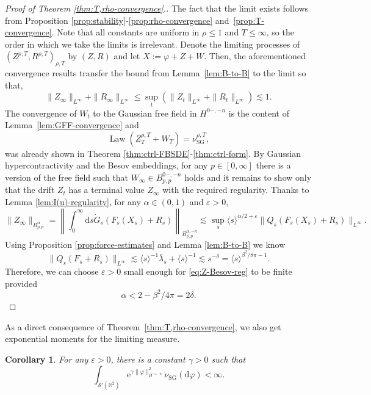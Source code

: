 \documentclass[11pt, a4paper]{scrartcl}
\numberwithin{equation}{section}
\theoremstyle{plain}
\newtheorem{corollary}[foo]{Corollary}
\theoremstyle{remark}
\newcommand{\assign}{:=}
\newcommand{\mathd}{\mathrm{d}}
\newcommand{\mathe}{\mathrm{e}}
\newcommand{\tmop}[1]{\ensuremath{\operatorname{#1}}}
\begin{document}
\begin{proof}[Proof of Theorem \ref{thm:T,rho-convergence}.]
  The fact that the limit exists follows from Proposition
  \ref{prop:stability}-\ref{prop:rho-convergence}
  and~\ref{prop:T-convergence}. Note that all constants are uniform in $\rho
  \leqslant 1$ and $T \leqslant \infty$, so the order in which we take the
  limits is irrelevant. Denote the limiting processes of $(Z^{\rho, T},
  R^{\rho, T})_{\rho, T}$ by $(Z, R)$ and let $X \assign \varphi + Z + W$.
  Then, the aforementioned convergence results transfer the bound from
  Lemma~\ref{lem:B-to-B} to the limit so that,
  \[ \| Z_{\infty} \|_{L^{\infty}} + \| R_{\infty} \|_{L^{\infty}} \leqslant
     \sup_t (\| Z_t \|_{L^{\infty}} + \| R_t \|_{L^{\infty}}) \lesssim 1. \]
  The convergence of $W_t$ to the Gaussian free field in $H^{0 -, - n}$ is the
  content of Lemma~\ref{lem:GFF-convergence} and
  \[ \tmop{Law} (Z_T^{\rho, T} + W_T) = \nu_{\tmop{SG}}^{\rho, T}, \]
  was already shown in Theorem \ref{thm:ctrl-FBSDE}-\ref{thm:ctrl-form}. By
  Gaussian hypercontractivity and the Besov embeddings,
  for any $p \in [0, \infty]$ there is a version
  of the free field such that $W_{\infty} \in B_{p, p}^{0 -, - n}$ holds and it
  remains to show only that the drift $Z_t$ has a terminal value $Z_{\infty}$
  with the required regularity. Thanks to Lemma \ref{lem:I(u)-regularity}, for
  any $\alpha \in (0, 1)$ and $\varepsilon > 0$,
  \begin{equation}
    \| Z_{\infty} \|_{B_{p, p}^{\alpha}} = \left\| \int_0^{\infty} \mathd s
    \dot{G}_s (F_s (X_s) + R_s) \right\|_{B_{p, p}^{\alpha, - n}} \lesssim
    \sup_s \langle s \rangle^{\alpha / 2 + \varepsilon} \| Q_s (F_s(X_s) + R_s)
    \|_{L^{\infty}} . \label{eq:Z-Besov-reg}
  \end{equation}
  Using Proposition \ref{prop:force-estimates} and Lemma \ref{lem:B-to-B} we
  know
  \[ \| Q_s (F_s + R_s) \|_{L^{\infty}} \lesssim \langle s \rangle^{- 1}
     \bar{\lambda}_s + \langle s \rangle^{- 1} \lesssim s^{- \delta} = \langle s\rangle^{\beta^2 /
     8 \pi - 1} . \]
  Therefore, we can choose $\varepsilon > 0$ small enough for
  \eqref{eq:Z-Besov-reg} to be finite provided
  \[ \alpha < 2 - \beta^2 / 4 \pi = 2 \delta . \]
\end{proof}

As a direct consequence of Theorem~\ref{thm:T,rho-convergence}, we also get
exponential moments for the limiting measure.

\begin{corollary}
  \label{cor:exp-integrability} For any $\varepsilon > 0$, there is a constant
  $\gamma > 0$ such that
  \[ \int_{\mathcal{S}' (\mathbb{R}^2)} \mathe^{\gamma \| \varphi \|_{H^{-
     \varepsilon, - n}}^2} \nu_{\tmop{SG}} (\mathd \varphi) < \infty . \]
\end{corollary}
\end{document}
